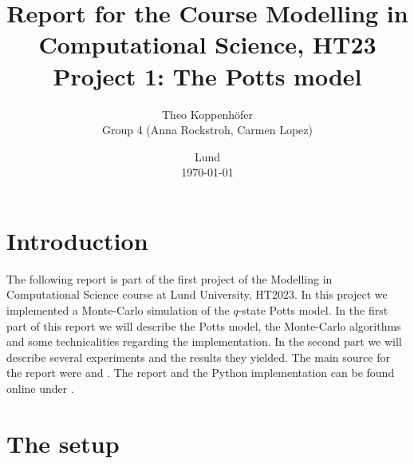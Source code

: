 




\title{ Report for the Course Modelling in Computational Science, HT23 \\[1ex]
	  \large Project 1: The Potts model}
\author{Theo Koppenhöfer \\[1ex] Group 4 (Anna Rockstroh, Carmen Lopez)}
\date{Lund \\[1ex] \today}



\usepackage{pythonhighlight}
\usepackage{pgfplots}
\graphicspath{{../Figures/}}






\maketitle

\section{Introduction}

The following report is part of the first project of the Modelling in Computational Science course at Lund University, HT2023.
In this project we implemented a Monte-Carlo simulation of the $q$-state Potts model. In the first part of this report we will describe the Potts model, the Monte-Carlo algorithms and some technicalities regarding the implementation. In the second part we will describe several experiments and the results they yielded. The main source for the report were \cite{AndersIrsb} and  \cite{AndersIrsb2}.
The report and the Python implementation can be found online under \cite{Repository}.

\section{The setup}

